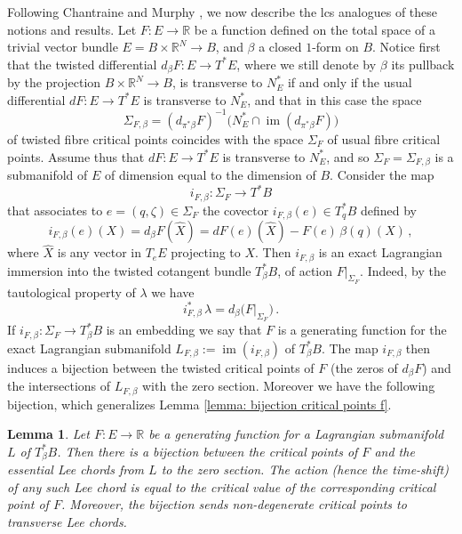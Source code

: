 \documentclass{amsart}
\DeclareMathOperator{\im}{im}
\newtheorem{lemma}[thm]{Lemma}
\theoremstyle{remark}
\begin{document}
Following Chantraine and Murphy \cite{CM},
we now describe the lcs analogues
of these notions and results.
Let $F: E \rightarrow \mathbb{R}$ be a function
defined on the total space
of a trivial vector bundle $E = B \times \mathbb{R}^N \rightarrow B$,
and $\beta$ a closed $1$-form on $B$.
Notice first that the twisted differential $d_{\beta}F: E \rightarrow T^{\ast}E$,
where we still denote by $\beta$ its pullback
by the projection $B \times \mathbb{R}^N \rightarrow B$,
is transverse to $N_E^{\ast}$
if and only if the usual differential $dF: E \rightarrow T^{\ast}E$
is transverse to $N_E^{\ast}$,
and that in this case
the space
\[
\Sigma_{F, \beta} = ( d_{\pi^{\ast}\beta}F )^{-1}
\big( N_E^{\ast} \cap \im (d_{\pi^{\ast}\beta}F) \big)
\]
of twisted fibre critical points
coincides with the space $\Sigma_F$
of usual fibre critical points.
Assume thus that $dF: E \rightarrow T^{\ast}E$ is transverse to $N_E^{\ast}$,
and so $\Sigma _F = \Sigma_{F, \beta}$
is a submanifold of $E$
of dimension equal to the dimension of $B$.
Consider the map
\[
i_{F, \beta}: \Sigma_F \rightarrow T^{\ast}B
\]
that associates to $e = (q, \zeta) \in \Sigma_F$
the covector $i_{F, \beta}(e) \in T_q^{\ast}B$
defined by
\[
i_{F, \beta}(e) (X)
= d_{\beta}F (\hat{X})
= dF (e) (\hat{X}) - F(e) \, \beta (q) (X) \,,
\]
where $\hat{X}$ is any vector in $T_eE$
projecting to $X$. Then $i_{F, \beta}$ is an exact Lagrangian immersion
into the twisted cotangent bundle $T_{\beta}^{\ast}B$,
of action $\left. F \right\lvert_{\Sigma_F}$.
Indeed, by the tautological property of $\lambda$
we have
\begin{equation}\label{equation: pullback of lambda}
i_{F, \beta}^{\ast} \, \lambda
= d_{\beta} \big( \left. F \right\lvert_{\Sigma_F} \big) \,.
\end{equation}
If $i_{F, \beta}: \Sigma_F \rightarrow T^{\ast}_{\beta}B$
is an embedding
we say that $F$ is a generating function
for the exact Lagrangian submanifold
$L_{F, \beta} := \im (i_{F, \beta})$
of $T_{\beta}^{\ast}B$.
The map $i_{F, \beta}$ then induces a bijection
between the twisted critical points of $F$
(the zeros of $d_{\beta}F$)
and the intersections of $L_{F, \beta}$
with the zero section.
Moreover we have the following bijection,
which generalizes Lemma \ref{lemma: bijection critical points f}.

\begin{lemma}\label{lemma: bijection critical points F}
Let $F: E \rightarrow \mathbb{R}$ be a generating function
for a Lagrangian submanifold $L$ of $T_{\beta}^{\ast}B$.
Then there is a bijection between the critical points of $F$
and the essential Lee chords from $L$ to the zero section.
The action (hence the time-shift) of any such Lee chord
is equal to the critical value
of the corresponding critical point of $F$.
Moreover,
the bijection sends non-degenerate critical points
to transverse Lee chords.
\end{lemma}
\end{document}
